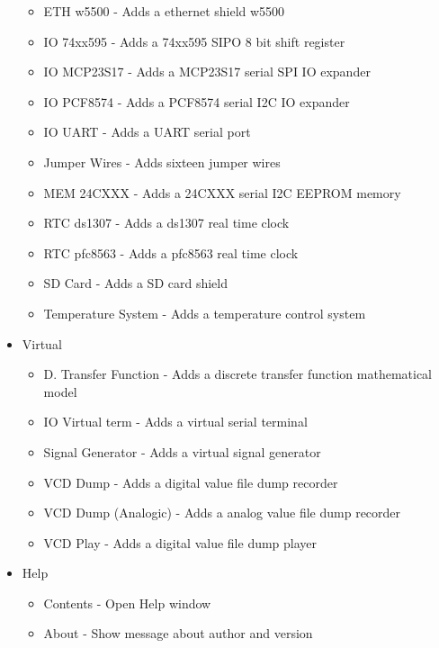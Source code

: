 \begin{itemize}
  \begin{itemize}
   \item ETH w5500 - Adds a ethernet shield w5500
   \item IO 74xx595 - Adds a 74xx595 SIPO 8 bit shift register
   \item IO MCP23S17 - Adds a MCP23S17 serial SPI IO expander
   \item IO PCF8574 - Adds a PCF8574 serial I2C IO expander
   \item IO UART - Adds a UART serial port 
   \item Jumper Wires - Adds sixteen jumper wires 
   \item MEM 24CXXX - Adds a 24CXXX serial I2C EEPROM  memory
   \item RTC ds1307 - Adds a ds1307 real time clock 
   \item RTC pfc8563 - Adds a pfc8563 real time clock
   \item SD Card - Adds a SD card shield
   \item Temperature System - Adds a temperature control system
  \end{itemize}
\item{Virtual}
  \begin{itemize}
  \item D. Transfer Function - Adds a discrete transfer function mathematical model
  \item IO Virtual term - Adds a virtual serial terminal 
  \item Signal Generator - Adds a virtual signal generator
  \item VCD Dump - Adds a digital value file dump recorder 
  \item VCD Dump (Analogic) - Adds a analog value file dump recorder  
  \item VCD Play - Adds a digital value file dump player  
  \end{itemize}   
 \item Help
 \begin{itemize}
 \item Contents - Open Help window
 \item About - Show message about author and version
\end{itemize}
\end{itemize}


